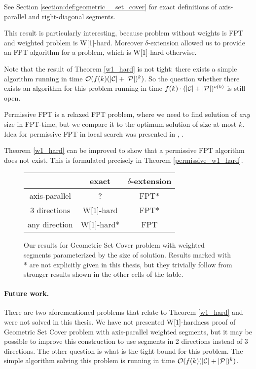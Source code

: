 See Section \ref{section:def:geometric__set_cover}
for exact definitions of axis-parallel and right-diagonal segments.

This result is particularly interesting,
because problem without weights is FPT and weighted problem is W[1]-hard.
Moreover $\delta$-extension allowed us to provide an FPT algorithm
for a problem, which is W[1]-hard otherwise.

Note that the result of Theorem \ref{w1_hard} is not tight:
there exists a simple algorithm 
running in time ${\mathcal{O}(f(k)(|\mathcal{C}| + |\mathcal{P}|)^k)}$.
So the question whether there exists an algorithm
for this problem running in time ${f(k)\cdot(|\mathcal{C}| + |\mathcal{P}|)^{o(k)}}$
is still open.

Permissive FPT is a relaxed FPT problem, where 
we need to find solution of \textit{any} size in FPT-time,
but we compare it to the optimum solution of size at most $k$.
Idea for permissive FPT in local search was presented
in \cite{permissive_problem1}, \cite{permissive_problem2}.

Theorem \ref{w1_hard} can be improved to show that a permissive FPT
algorithm does not exist.
This is formulated precisely in Theorem \ref{permissive_w1_hard}.

\begin{figure}[h]
\begin{center}
\begin{tabular}{ | c | c | c | }
\hline
                & exact     & $\delta$-extension \\ 
\hline                
 axis-parallel   & ? & FPT* \\  
\hline                
 3 directions    & W[1]-hard & FPT* \\  
\hline                
 any direction   & W[1]-hard* & FPT \\
\hline                
\end{tabular}
\caption{Our results for Geometric Set Cover problem with weighted segments 
parameterized by the size of solution.
Results marked with * are not explicitly given in this thesis,
but they trivially follow from stronger results shown in the other cells of the table.}
\label{tab:weighted_fpt}
\end{center}
\end{figure}

\paragraph{Future work.} There are two aforementioned problems
that relate to Theorem \ref{w1_hard} and were not solved in this thesis.
We have not presented W[1]-hardness proof
of Geometric Set Cover problem with axis-parallel weighted segments,
but it may be possible to improve this construction to use segments
in 2 directions instead of 3 directions. 
The other question is what is the tight bound for this problem.
The simple algorithm solving
this problem is running in time ${\mathcal{O}(f(k)(|\mathcal{C}| + |\mathcal{P}|)^k)}$.

